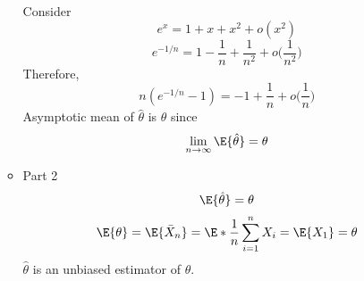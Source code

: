 \begin{Example}{}{}
\begin{enumerate}[label=(\roman*)]
\begin{itemize}
                        Consider
                        \[ e^x=1+x+x^2+o(x^2) \]
                        \[ e^{-1/n}=1-\frac{1}{n} +\frac{1}{n^2}+o
                            \biggl(\frac{1}{n^2}\biggr)  \]
                        Therefore,
                        \[ n(e^{-1/n}-1)=-1+\frac{1}{n} +
                            o\biggl(\frac{1}{n}\biggr) \]
                        Asymptotic mean of $ \hat{\theta} $ is $ \theta $ since
                        \[ \lim\limits_{{n} \to {\infty}} \E{\hat{\theta}}=\theta \]
                  \item Part 2
                        \[ \E{\hat{\theta}}=\theta \]
                        \[ \E{\theta}=\E{\bar{X}_n}=\E*{\frac{1}{n} \sum_{i=1}^{n} X_i}=
                            \E{X_1}=\theta \]
                        $ \hat{\theta} $ is an unbiased estimator of $ \theta $.
              \end{itemize}
    \end{enumerate}
\end{Example}
